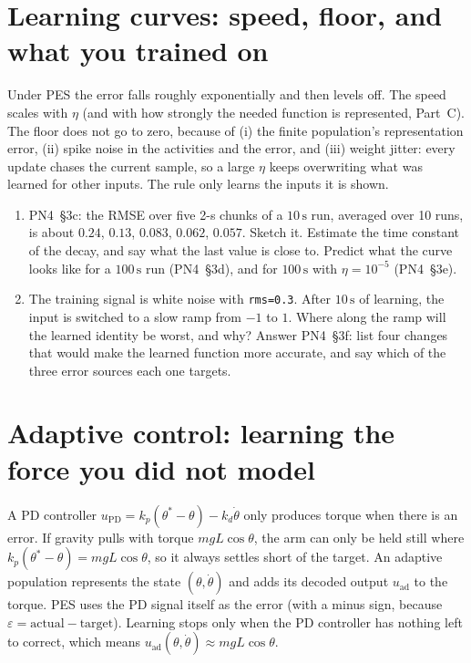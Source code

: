 \documentclass[11pt,letterpaper]{article}
\begin{document}
\section{Learning curves: speed, floor, and what you trained on}

\begin{idea}
Under PES the error falls roughly exponentially and then levels off. The speed scales with $\eta$ (and with how strongly the needed function is represented, Part~C). The floor does not go to zero, because of (i) the finite population's representation error, (ii) spike noise in the activities and the error, and (iii) weight jitter: every update chases the current sample, so a large $\eta$ keeps overwriting what was learned for other inputs. The rule only learns the inputs it is shown.
\end{idea}

\begin{enumerate}
\item PN4~\S3c: the RMSE over five 2-s chunks of a $10\,\mathrm{s}$ run, averaged over 10 runs, is about $0.24$, $0.13$, $0.083$, $0.062$, $0.057$. Sketch it. Estimate the time constant of the decay, and say what the last value is close to. Predict what the curve looks like for a $100\,\mathrm{s}$ run (PN4~\S3d), and for $100\,\mathrm{s}$ with $\eta = 10^{-5}$ (PN4~\S3e).
\item The training signal is white noise with \texttt{rms=0.3}. After $10\,\mathrm{s}$ of learning, the input is switched to a slow ramp from $-1$ to $1$. Where along the ramp will the learned identity be worst, and why? Answer PN4~\S3f: list four changes that would make the learned function more accurate, and say which of the three error sources each one targets.
\end{enumerate}

\section{Adaptive control: learning the force you did not model}

\begin{idea}
A PD controller $u_{\mathrm{PD}} = k_p(\theta^* - \theta) - k_d\dot\theta$ only produces torque when there is an error. If gravity pulls with torque $mgL\cos\theta$, the arm can only be held still where $k_p(\theta^* - \theta) = mgL\cos\theta$, so it always settles short of the target. An adaptive population represents the state $(\theta, \dot\theta)$ and adds its decoded output $u_{\mathrm{ad}}$ to the torque. PES uses the PD signal itself as the error (with a minus sign, because $\varepsilon = \text{actual} - \text{target}$). Learning stops only when the PD controller has nothing left to correct, which means $u_{\mathrm{ad}}(\theta, \dot\theta) \approx mgL\cos\theta$.
\end{idea}
\end{document}
